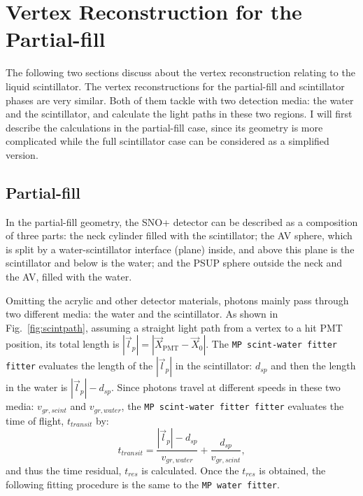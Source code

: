 \section{Vertex Reconstruction for the Partial-fill}\label{sect:partialFitter}
The following two sections discuss about the vertex reconstruction relating to the liquid scintillator. The vertex reconstructions for the partial-fill and scintillator phases are very similar. Both of them tackle with two detection media: the water and the scintillator, and calculate the light paths in these two regions. I will first describe the calculations in the partial-fill case, since its geometry is more complicated while the full scintillator case can be considered as a simplified version.

\subsection{Partial-fill}
In the partial-fill geometry, the SNO+ detector can be described as a composition of three parts: the neck cylinder filled with the scintillator; the AV sphere, which is split by a water-scintillator interface (plane) inside, and above this plane is the scintillator and below is the water; and the PSUP sphere outside the neck and the AV, filled with the water.

Omitting the acrylic and other detector materials, photons mainly pass through two different media: the water and the scintillator. As shown in Fig.~\ref{fig:scintpath}, assuming a straight light path from a vertex to a hit PMT position, its total length is $|\vec{l}_p|=|\vec{X}_\mathrm{PMT}-\vec{X}_0|$. The \texttt{MP scint-water fitter fitter} evaluates the length of the $|\vec{l}_p|$ in the scintillator: $d_{sp}$ and then the length in the water is $|\vec{l}_p|-d_{sp}$. Since photons travel at different speeds in these two media: $v_{gr,scint}$ and $v_{gr,water}$, the \texttt{MP scint-water fitter fitter} evaluates the time of flight, $t_{transit}$ by:
\begin{equation}
t_{transit} = \frac{|\vec{l}_p|-d_{sp}}{v_{gr,water}} +\frac{d_{sp}}{v_{gr,scint}},
\end{equation}
and thus the time residual, $t_{res}$ is calculated. Once the $t_{res}$ is obtained, the following fitting procedure is the same to the \texttt{MP water fitter}.

